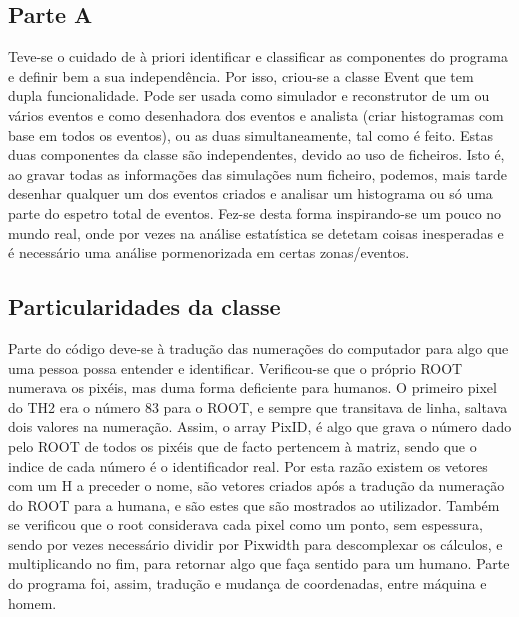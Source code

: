 \documentclass{article}
\begin{document}
\begin{multicols}{2}

\section{Parte A }
	Teve-se o cuidado de à priori identificar e classificar as componentes do programa e definir bem a sua independência. Por isso, criou-se a classe Event que tem dupla funcionalidade. Pode ser usada como simulador e reconstrutor de um ou vários eventos e como desenhadora dos eventos e analista (criar histogramas com base em todos os eventos), ou as duas simultaneamente, tal como é feito.
Estas duas componentes da classe são independentes, devido ao uso de ficheiros. Isto é, ao gravar todas as informações das simulações num ficheiro, podemos, mais tarde desenhar qualquer um dos eventos criados e analisar um histograma ou só uma parte do espetro total de eventos. Fez-se desta forma inspirando-se um pouco no mundo real, onde por vezes na análise estatística se detetam coisas inesperadas e é necessário uma análise pormenorizada em certas zonas/eventos.
\subsection{Particularidades da classe}
	Parte do código deve-se à tradução das numerações do computador para algo que uma pessoa possa entender e identificar. Verificou-se que o próprio ROOT numerava os pixéis, mas duma forma deficiente para humanos. O primeiro pixel do TH2 era o número 83 para o ROOT, e sempre que transitava de linha, saltava dois valores na numeração. Assim, o array PixID, é algo que grava o número dado pelo ROOT de todos os pixéis que de facto pertencem à matriz, sendo que o indice de cada número é o identificador real.
	Por esta razão existem os vetores com um H a preceder o nome, são vetores criados após a tradução da numeração do ROOT para a humana, e são estes que são mostrados ao utilizador.
	Também se verificou que o root considerava cada pixel como um ponto, sem espessura, sendo por vezes necessário dividir por Pixwidth para descomplexar os cálculos, e multiplicando no fim, para retornar algo que faça sentido para um humano. 
	Parte do programa foi, assim, tradução e mudança de coordenadas, entre máquina e homem.

\end{multicols}
\end{document}

